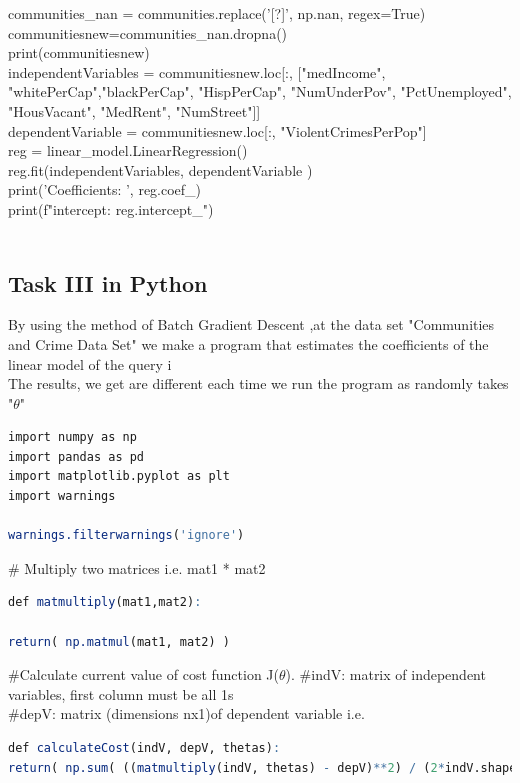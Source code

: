 \documentclass[10pt,a4paper]{article}
\begin{document}
	communities\_nan = communities.replace('[?]', np.nan, regex=True)\\
	
	
	communitiesnew=communities\_nan.dropna()\\
	print(communitiesnew)\\
	
	independentVariables = communitiesnew.loc[:, ["medIncome", "whitePerCap","blackPerCap", "HispPerCap", "NumUnderPov", "PctUnemployed", "HousVacant", "MedRent", "NumStreet"]]\\
	
	dependentVariable = communitiesnew.loc[:, "ViolentCrimesPerPop"]\\
	
	reg = linear\_model.LinearRegression()\\
	
	reg.fit(independentVariables, dependentVariable )\\
	
	print('Coefficients: ', reg.coef\_)\\
	print(f"intercept: {reg.intercept\_}")\\
	\\
	\subsection{Task III in Python}
By using the method of Batch Gradient Descent ,at the data set "Communities and Crime Data Set" we make a program that estimates the coefficients of the linear model of the query i\\
The results, we get  are different each time we run the program as randomly takes "$\theta$"\\
	\begin{lstlisting}[language=R]
import numpy as np
import pandas as pd
import matplotlib.pyplot as plt
import warnings
	
warnings.filterwarnings('ignore')
	\end{lstlisting}
	
\# Multiply two matrices i.e. mat1 * mat2
\begin{lstlisting}[language=R]
def matmultiply(mat1,mat2):
	
return( np.matmul(mat1, mat2) )
\end{lstlisting}
\#Calculate current value of cost function J($\theta$).
\#indV: matrix of independent variables, first column must be all 1s\\
\#depV: matrix (dimensions nx1)of dependent variable i.e.\\
\begin{lstlisting}[language=R]	
def calculateCost(indV, depV, thetas):
return( np.sum( ((matmultiply(indV, thetas) - depV)**2) / (2*indV.shape[0]) ) )  
\end{lstlisting}
	
\end{document}
